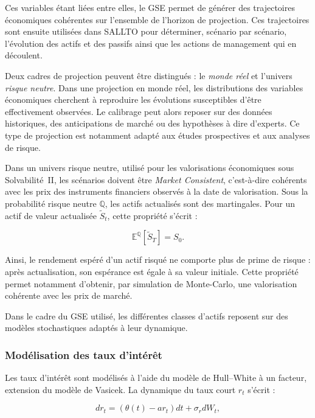 Ces variables étant liées entre elles, le GSE permet de générer des trajectoires économiques cohérentes sur l'ensemble de l'horizon de projection. Ces trajectoires sont ensuite utilisées dans SALLTO pour déterminer, scénario par scénario, l'évolution des actifs et des passifs ainsi que les actions de management qui en découlent.

Deux cadres de projection peuvent être distingués : le \textit{monde réel} et l'univers \textit{risque neutre}. Dans une projection en monde réel, les distributions des variables économiques cherchent à reproduire les évolutions susceptibles d'être effectivement observées. Le calibrage peut alors reposer sur des données historiques, des anticipations de marché ou des hypothèses à dire d'experts. Ce type de projection est notamment adapté aux études prospectives et aux analyses de risque.

Dans un univers risque neutre, utilisé pour les valorisations économiques sous Solvabilité~II, les scénarios doivent être \textit{Market Consistent}, c'est-à-dire cohérents avec les prix des instruments financiers observés à la date de valorisation. Sous la probabilité risque neutre $\mathbb{Q}$, les actifs actualisés sont des martingales. Pour un actif de valeur actualisée $\widetilde{S}_t$, cette propriété s'écrit :

\begin{equation}
    \mathbb{E}^{\mathbb{Q}}\left[\widetilde{S}_T\right] = S_0.
\end{equation}

Ainsi, le rendement espéré d'un actif risqué ne comporte plus de prime de risque : après actualisation, son espérance est égale à sa valeur initiale. Cette propriété permet notamment d'obtenir, par simulation de Monte-Carlo, une valorisation cohérente avec les prix de marché.

Dans le cadre du GSE utilisé, les différentes classes d'actifs reposent sur des modèles stochastiques adaptés à leur dynamique.

\subsubsection*{Modélisation des taux d'intérêt}

Les taux d'intérêt sont modélisés à l'aide du modèle de Hull--White à un facteur, extension du modèle de Vasicek. La dynamique du taux court $r_t$ s'écrit :

\begin{equation}
    dr_t = \left(\theta(t)-a r_t\right)dt + \sigma_r dW_t,
\end{equation}

